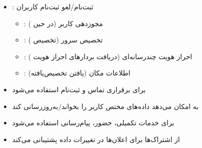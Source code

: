 
\begin{itemize}
\tightlist
\item
  : ثبت‌نام/\allowbreak{}لغو ثبت‌نام کاربران 

  \begin{itemize}
  \tightlist
  \item
    : مجوزدهی کاربر (در حین )
  \item
    : تخصیص سرور (تخصیص )
  \item
    : احراز هویت چندرسانه‌ای (دریافت بردارهای احراز هویت )
  \item
    : اطلاعات مکان (یافتن  تخصیص‌یافته)
  \end{itemize}
\item
  برای برقراری تماس  و ثبت‌نام  استفاده می‌شود
\end{itemize}


\begin{itemize}
\tightlist
\item
  به  امکان می‌دهد داده‌های مختص کاربر را بخواند/\allowbreak{}به‌روزرسانی کند
\item
  برای خدمات تکمیلی، حضور، پیام‌رسانی استفاده می‌شود
\item
  از اشتراک‌ها برای اعلان‌ها در تغییرات داده پشتیبانی می‌کند
\end{itemize}




\CNchained{}





